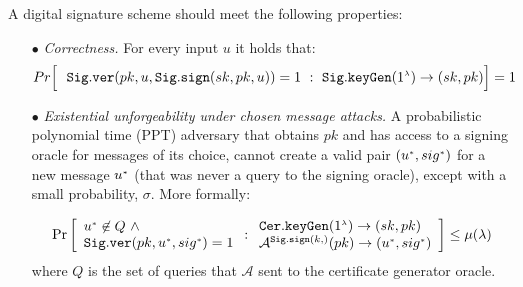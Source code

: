 A digital signature scheme should meet the following properties:

\begin{itemize} 
\item[$\bullet$]  \textit{Correctness.} For every input $u$ it holds that:
%
$$Pr\Big[\  \  \mathtt{Sig.ver}( pk, u, \mathtt{Sig.sign}(sk, pk, u))=1\ : \
\mathtt{Sig.keyGen}(1^{\scriptscriptstyle \lambda})\rightarrow (sk, pk)  \Big]=1$$
%
\item[$\bullet$] \textit{Existential unforgeability under chosen message attacks.} A probabilistic polynomial time (PPT) adversary that obtains $pk$ and has access to a signing  oracle for messages of its choice, cannot create a valid pair $(u^{\scriptscriptstyle *},sig^{\scriptscriptstyle *})$ for a new message $u^{\scriptscriptstyle *}$  (that was never a query to the signing oracle), except with a small probability, $\sigma$. More formally: 




\small{
$$ \Pr\left[
  \begin{array}{l}
  
  u^{\st *}\not\in Q\ \wedge \\
   \mathtt{Sig.ver}( pk,  u^{\st *}, sig^{\st *}) =1\\
  
  
    
\end{array} : 
    \begin{array}{l}
   
    \mathtt{Cer.keyGen}(1^{\st \lambda})\rightarrow (sk,pk) \\
  \mathcal{A}^{\mathtt{Sig.sign}(k,)}(pk)\rightarrow(u^{\st *}, sig^{\st *})

     
\end{array}    \right]\leq \mu(\lambda)$$
}
where $Q$ is the set of queries that $\mathcal{A}$ sent to the certificate generator oracle.
\end{itemize}




